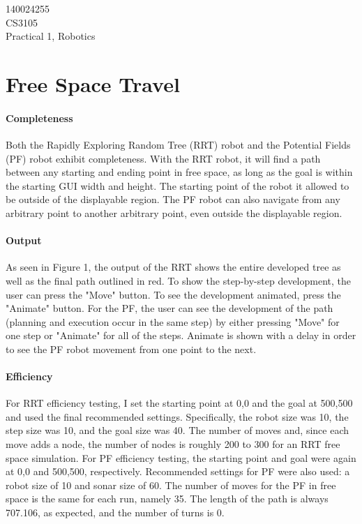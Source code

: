 \documentclass[12pt]{article}
\begin{document}
\begin{flushright}
140024255\\
CS3105\\
Practical 1, Robotics
\end{flushright}

\section{Free Space Travel}
\paragraph*{Completeness}
Both the Rapidly Exploring Random Tree (RRT) robot and the Potential Fields (PF) robot exhibit completeness. With the RRT robot, it will find a path between any starting and ending point in free space, as long as the goal is within the starting GUI width and height. The starting point of the robot it allowed to be outside of the displayable region. The PF robot can also navigate from any arbitrary point to another arbitrary point, even outside the displayable region.

\paragraph*{Output}
As seen in Figure 1, the output of the RRT shows the entire developed tree as well as the final path outlined in red. To show the step-by-step development, the user can press the "Move" button. To see the development animated, press the "Animate" button. For the PF, the user can see the development of the path (planning and execution occur in the same step) by either pressing "Move" for one step or "Animate" for all of the steps. Animate is shown with a delay in order to see the PF robot movement from one point to the next.

\paragraph*{Efficiency}
For RRT efficiency testing, I set the starting point at 0,0 and the goal at 500,500 and used the final recommended settings. Specifically, the robot size was 10, the step size was 10, and the goal size was 40.
The number of moves and, since each move adds a node, the number of nodes is roughly 200 to 300 for an RRT free space simulation. %
For PF efficiency testing, the starting point and goal were again at 0,0 and 500,500, respectively. Recommended settings for PF were also used: a robot size of 10 and sonar size of 60.
The number of moves for the PF in free space is the same for each run, namely 35. The length of the path is always 707.106, as expected, and the number of turns is 0.
\end{document}
